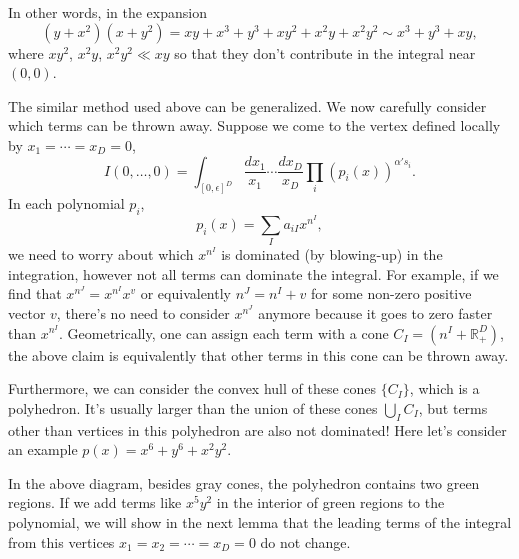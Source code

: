 \documentclass[12pt]{article}
\theoremstyle{definition}
\theoremstyle{plain}
\begin{document}
In other words, in the expansion 
\[
	(y+x^2)(x+y^2)=xy+x^3+y^3+xy^2+x^2y+x^2y^2\sim x^3+y^3+xy,
\]
where $xy^2$, $x^2y$, $x^2y^2\ll xy$ so that they don't contribute in the integral near $(0,0)$.


The similar method used above can be generalized. We now carefully consider which terms can be thrown away.
Suppose we come to the vertex defined locally by $x_1=\cdots=x_D=0$, 
\[
	I(0,\dots,0)=\int_{[0,\epsilon]^D} \frac{d x_1}{x_1}\cdots \frac{d x_D}{x_D} 
	\prod_i(p_i(x))^{\alpha' s_i}.
\]
In each polynomial $p_i$, 
\[
	p_i(x)=\sum_{I} a_{iI} x^{n^I},
\]
we need to worry about which $x^{n^I}$ is dominated (by blowing-up) in the integration,
however not all terms can dominate 
the integral. For example, if we find that $x^{n^J}=x^{n^I}x^{v}$ or equivalently $n^J=n^I+v$ for some 
non-zero positive vector $v$, there's no need to consider $x^{n^J}$ anymore because it goes to zero faster 
than $x^{n^I}$. Geometrically, one can assign each term with a cone $C_{I}=(n^I+\mathbb R^D_{+})$, the above
claim is equivalently that other terms in this cone can be thrown away.

Furthermore, we can consider the convex hull of these cones $\{C_I\}$, which is a polyhedron. 
It's usually larger than
the union of these cones $\bigcup_I C_I$, but terms other than vertices in this polyhedron 
are also not dominated! Here let's consider an example $p(x)=x^6+y^6+x^2y^2$. 
\begin{center}
\end{center}
In the above diagram, besides gray cones, the polyhedron contains two green regions. 
If we add terms like $x^5y^2$ in the interior of green regions to the polynomial, 
we will show in the next lemma that the leading terms of the integral 
from this vertices $x_1=x_2=\cdots=x_D=0$ do not change.
\end{document}
